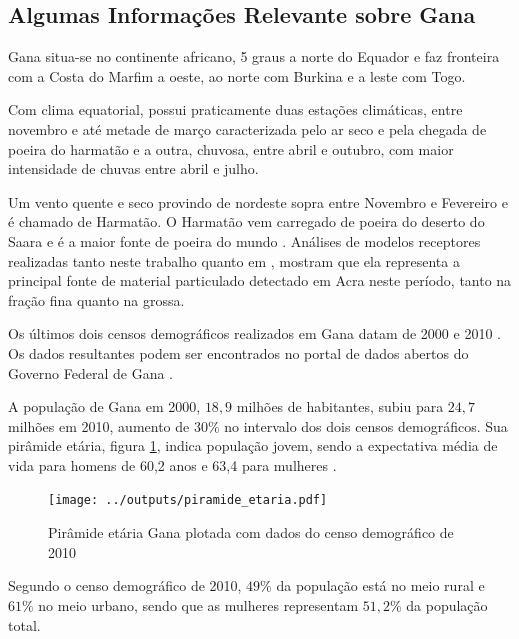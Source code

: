 \subsection{Algumas Informações Relevante sobre Gana}


Gana situa-se no continente africano, 5 graus a norte do Equador e 
faz fronteira com a Costa do Marfim a oeste, ao norte com Burkina
e a leste com Togo. 

Com clima equatorial, possui praticamente duas estações climáticas, 
entre novembro e até metade de março caracterizada pelo ar seco e pela 
chegada de poeira do harmatão e a outra, chuvosa, entre abril e outubro, 
com maior intensidade de chuvas entre abril e julho. 

Um vento quente e seco provindo de nordeste sopra entre Novembro e Fevereiro 
e é chamado de Harmatão. O Harmatão vem carregado de poeira do 
deserto do Saara e é a maior fonte de poeira do mundo \citep{breuning2005}. 
Análises de modelos receptores realizadas tanto neste trabalho quanto em 
\cite{zhou2011}, mostram que ela representa a principal fonte de material 
particulado detectado em Acra neste período, tanto na fração fina quanto na grossa.

Os últimos dois censos demográficos realizados em Gana datam
de 2000 \citep{ghanacensus2003} e 2010 \citep{ghanacensus2013}. Os
dados resultantes podem ser encontrados no portal de dados abertos
do Governo Federal de Gana \citep{opendataghana}.

A população de Gana em 2000, $18,9$ milhões de habitantes, subiu para $24,7$ 
milhões em 2010, aumento de $30\%$ no intervalo dos dois censos demográficos. 
Sua pirâmide etária, figura \ref{fig:piramedegana}, indica população 
jovem, sendo a expectativa média de vida para homens de 60,2 anos e 
63,4 para mulheres \citep{ghanacensus2013}.

\begin{figure}[H]
  \centering
  \texttt{[image: ../outputs/piramide\_etaria.pdf]}
  \caption{Pirâmide etária Gana plotada com dados do censo 
           demográfico de 2010 \citep{ghanacensus2013} \label{fig:piramedegana}}
\end{figure}

Segundo o censo demográfico de 2010, $49\%$ da população está no meio rural e 
$61\%$ no meio urbano, sendo que as mulheres representam $51,2\%$ da população
total.

